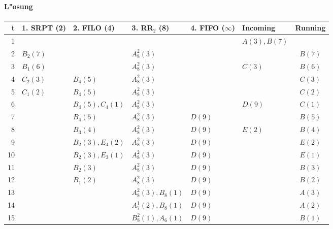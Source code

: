 \paragraph{L"osung}

\begin{center}
  \begin{tabular}{rlllllc}
    \toprule
    t  & 1. SRPT (2) & 2. FILO (4)      & 3. RR${}_2$ (8)    & 4. FIFO ($\infty$) & Incoming     & Running \\
    \midrule
    1  &             &                  &                    &                    & $A(3), B(7)$ & \\
    2  & $B_2(7)$    &                  & $A_8^2(3)$         &                    &              & $B(7)$ \\
    3  & $B_1(6)$    &                  & $A_8^2(3)$         &                    & $C(3)$       & $B(6)$ \\
    4  & $C_2(3)$    & $B_4(5)$         & $A_8^2(3)$         &                    &              & $C(3)$ \\
    5  & $C_1(2)$    & $B_4(5)$         & $A_8^2(3)$         &                    &              & $C(2)$ \\
    6  &             & $B_4(5), C_4(1)$ & $A_8^2(3)$         &                    & $D(9)$       & $C(1)$ \\
    7  &             & $B_4(5)$         & $A_8^2(3)$         & $D(9)$             &              & $B(5)$ \\
    8  &             & $B_3(4)$         & $A_8^2(3)$         & $D(9)$             & $E(2)$       & $B(4)$ \\
    9  &             & $B_2(3), E_4(2)$ & $A_8^2(3)$         & $D(9)$             &              & $E(2)$ \\
    10 &             & $B_2(3), E_3(1)$ & $A_8^2(3)$         & $D(9)$             &              & $E(1)$ \\
    11 &             & $B_2(3)$         & $A_8^2(3)$         & $D(9)$             &              & $B(3)$ \\
    12 &             & $B_1(2)$         & $A_8^2(3)$         & $D(9)$             &              & $B(2)$ \\
    13 &             &                  & $A_8^2(3), B_8(1)$ & $D(9)$             &              & $A(3)$ \\
    14 &             &                  & $A_7^1(2), B_8(1)$ & $D(9)$             &              & $A(2)$ \\
    15 &             &                  & $B_8^2(1), A_6(1)$ & $D(9)$             &              & $B(1)$ \\

\end{tabular}
\end{center}
